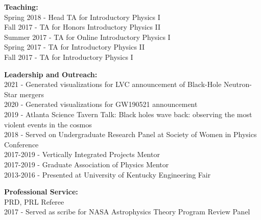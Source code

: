 \documentclass[11pt]{article}
\begin{document}
\begin{flushleft}
  \textbf{Teaching:}\\
  Spring 2018 - Head TA for Introductory Physics I\\
  Fall 2017 - TA for Honors Introductory Physics II\\
  Summer 2017 - TA for Online Introductory Physics I\\
  Spring 2017 - TA for Introductory Physics II\\
  Fall 2017 - TA for Introductory Physics I\\
 
  \vspace{8px}   
 
  \textbf{Leadership and Outreach:}\\
  2021 - Generated visualizations for LVC announcement of Black-Hole Neutron-Star mergers\\
  2020 - Generated visualizations for GW190521 announcement\\
  2019 - Atlanta Science Tavern Talk: Black holes wave back: observing the most violent events in the cosmos\\
  2018 - Served on Undergraduate Research Panel at Society of Women in Physics Conference\\
  2017-2019 - Vertically Integrated Projects Mentor\\
  2017-2019 - Graduate Association of Physics Mentor\\
  2013-2016 - Presented at University of Kentucky Engineering Fair\\

  \vspace{8px}

  \textbf{Professional Service: }\\
  PRD, PRL Referee\\
  2017 - Served as scribe for NASA Astrophysics Theory Program Review Panel\\
  
\end{flushleft}
\end{document}
